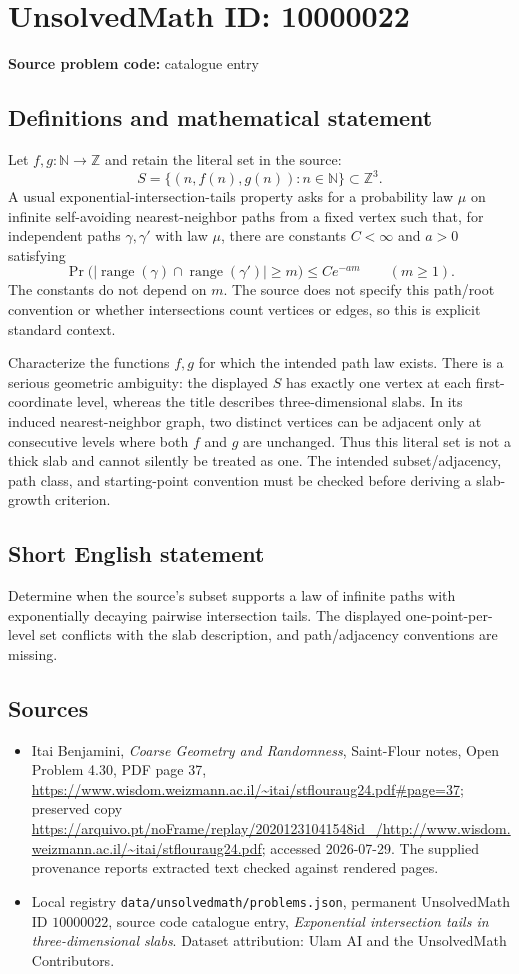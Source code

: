 \documentclass[11pt]{article}
\begin{document}
\section*{UnsolvedMath ID: 10000022}
\textbf{Source problem code:} catalogue entry
\subsection{Definitions and mathematical statement}
Let $f,g:\mathbb N\to\mathbb Z$ and retain the literal set in the source:
\[
S=\{(n,f(n),g(n)):n\in\mathbb N\}\subset\mathbb Z^3.
\]
A usual exponential-intersection-tails property asks for a probability law $\mu$ on infinite self-avoiding nearest-neighbor paths from a fixed vertex such that, for independent paths $\gamma,\gamma'$ with law $\mu$, there are constants $C<\infty$ and $a>0$ satisfying
\[
\Pr\bigl(|\operatorname{range}(\gamma)\cap\operatorname{range}(\gamma')|\geq m\bigr)
\leq Ce^{-am}\qquad(m\geq1).
\]
The constants do not depend on $m$. The source does not specify this path/root convention or whether intersections count vertices or edges, so this is explicit standard context.

Characterize the functions $f,g$ for which the intended path law exists. There is a serious geometric ambiguity: the displayed $S$ has exactly one vertex at each first-coordinate level, whereas the title describes three-dimensional slabs. In its induced nearest-neighbor graph, two distinct vertices can be adjacent only at consecutive levels where both $f$ and $g$ are unchanged. Thus this literal set is not a thick slab and cannot silently be treated as one. The intended subset/adjacency, path class, and starting-point convention must be checked before deriving a slab-growth criterion.
\subsection{Short English statement}
Determine when the source's subset supports a law of infinite paths with exponentially decaying pairwise intersection tails. The displayed one-point-per-level set conflicts with the slab description, and path/adjacency conventions are missing.
\subsection{Sources}
\begin{itemize}
\item Itai Benjamini, \emph{Coarse Geometry and Randomness}, Saint-Flour notes, Open Problem 4.30, PDF page 37, \url{https://www.wisdom.weizmann.ac.il/~itai/stflouraug24.pdf#page=37}; preserved copy \url{https://arquivo.pt/noFrame/replay/20201231041548id_/http://www.wisdom.weizmann.ac.il/~itai/stflouraug24.pdf}; accessed 2026-07-29. The supplied provenance reports extracted text checked against rendered pages.
\item Local registry \texttt{data/unsolvedmath/problems.json}, permanent UnsolvedMath ID $10000022$, source code catalogue entry, \emph{Exponential intersection tails in three-dimensional slabs}. Dataset attribution: Ulam AI and the UnsolvedMath Contributors.
\end{itemize}
\end{document}
